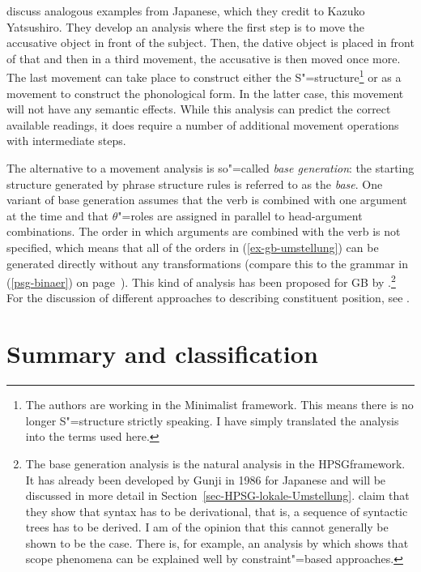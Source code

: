 \citet[]{SE2002a} discuss analogous examples from Japanese, which they credit to Kazuko 
Yatsushiro. They develop an analysis where the first step is to move the accusative object in front of the subject.
Then, the dative object is placed in front of that and then in a third movement, the accusative is then moved once more. The last movement can
take place to construct either the S"=structure\footnote{
	The authors are working in the Minimalist framework. This means there is no longer S"=structure strictly speaking. I
	have simply translated the analysis into the terms used here.
}
or as a movement to construct the phonological form. In the latter case, this movement will not have any semantic effects.
While this analysis can predict the correct available readings, it does require a number of additional movement operations with intermediate steps.

The alternative to a movement analysis is so"=called \emph{base generation}: the starting structure generated by phrase structure
rules is referred to as the \emph{base}. One variant of base generation assumes that the verb is
combined with one argument at the time and that $\theta$"=roles are assigned in parallel to
head-argument combinations. The order in which
arguments are combined with the verb is not specified, which means that all of the orders in (\ref{ex-gb-umstellung}) can be
generated directly without any transformations (compare this to the grammar in (\ref{psg-binaer}) on page~\pageref{psg-binaer}). This kind of analysis has
been proposed for GB by \citet{Fanselow2001a}.\footnote{%
	The base generation analysis is the natural analysis in the HPSG\indexhpsg framework. It has already been developed by Gunji\nocite{Gunji86a}
	in 1986 for Japanese and will be discussed in more detail in Section~\ref{sec-HPSG-lokale-Umstellung}. \citet[--314]{SE2002a}
	claim that they show that syntax has to be derivational, that is, a sequence of syntactic
        trees has to be derived. I am of the opinion that this cannot generally be shown to be the
        case. There is, for example, an analysis by \citet{Kiss2001a} which shows that scope
        phenomena can be explained well by constraint"=based approaches.
}
For the discussion of different approaches to describing constituent position, see 
.




\section{Summary and classification}
\label{sec-summary-gb}

